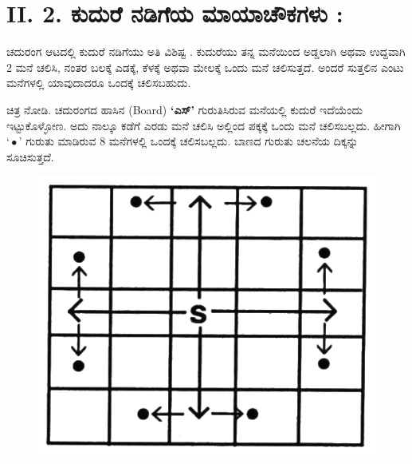 \section*{II. 2. ಕುದುರೆ ನಡಿಗೆಯ ಮಾಯಾಚೌಕಗಳು :}

ಚದುರಂಗ ಆಟದಲ್ಲಿ ಕುದುರೆ ನಡಿಗೆಯು ಅತಿ ವಿಶಿಷ್ಟ . ಕುದುರೆಯು ತನ್ನ ಮನೆಯಿಂದ ಅಡ್ಡಲಾಗಿ ಅಥವಾ ಉದ್ದವಾಗಿ 2 ಮನೆ ಚಲಿಸಿ, ನಂತರ ಬಲಕ್ಕೆ ಎಡಕ್ಕೆ, ಕೆಳಕ್ಕೆ ಅಥವಾ ಮೇಲಕ್ಕೆ ಒಂದು ಮನೆ ಚಲಿಸುತ್ತದೆ. ಅಂದರೆ ಸುತ್ತಲಿನ ಎಂಟು ಮನೆಗಳಲ್ಲಿ ಯಾವುದಾದರೂ ಒಂದಕ್ಕೆ ಚಲಿಸಬಹುದು.

ಚಿತ್ರ ನೋಡಿ. ಚದುರಂಗದ ಹಾಸಿನ (Board) \textbf{‘ಎಸ್’} ಗುರುತಿಸಿರುವ ಮನೆಯಲ್ಲಿ ಕುದುರೆ ಇದೆಯೆಂದು ಇಟ್ಟುಕೊಳ್ಳೋಣ. ಅದು ನಾಲ್ಕೂ ಕಡೆಗೆ ಎರಡು ಮನೆ ಚಲಿಸಿ ಅಲ್ಲಿಂದ ಪಕ್ಕಕ್ಕೆ ಒಂದು ಮನೆ ಚಲಿಸಬಲ್ಲದು. ಹೀಗಾಗಿ $‘\bullet ’$ ಗುರುತು ಮಾಡಿರುವ 8 ಮನೆಗಳಲ್ಲಿ ಒಂದಕ್ಕೆ ಚಲಿಸಬಲ್ಲದು. ಬಾಣದ ಗುರುತು ಚಲನೆಯ ದಿಕ್ಕನ್ನು ಸೂಚಿಸುತ್ತದೆ.
\begin{figure}[H]
\includegraphics{src/figures/chap6/fig6.2.jpg}
\end{figure}


